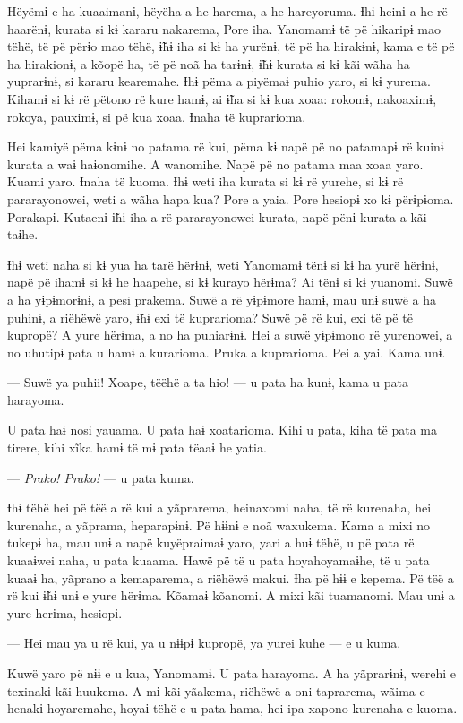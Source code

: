 Hëyëmɨ e ha kuaaimanɨ, hëyëha a he harema, a he hareyoruma. Ɨhɨ heinɨ a
he rë haarënɨ, kurata si kɨ kararu nakarema, Pore iha. Yanomamɨ të pë
hikaripɨ mao tëhë, të pë përɨo mao tëhë, ɨ̃hɨ iha si kɨ ha yurënɨ, të pë
ha hirakɨnɨ, kama e të pë ha hirakionɨ, a kõopë ha, të pë noã ha tarɨnɨ,
ɨ̃hɨ kurata si kɨ kãi wãha ha yuprarɨnɨ, si kararu kearemahe. Ɨhɨ pëma a
piyëmaɨ puhio yaro, si kɨ yurema. Kihamɨ si kɨ rë pëtono rë kure hamɨ,
ai ɨ̃ha si kɨ kua xoaa: rokomɨ, nakoaximɨ, rokoya, pauximɨ, si pë kua
xoaa. Ɨnaha të kuprarioma. 

Hei kamiyë pëma kɨnɨ no patama rë kui, pëma kɨ napë pë no patamapɨ rë
kuinɨ kurata a waɨ haɨonomihe. A wanomihe. Napë pë no patama maa xoaa
yaro. Kuami yaro. Ɨnaha të kuoma. Ɨhɨ weti iha kurata si kɨ rë yurehe,
si kɨ rë pararayonowei, weti a wãha hapa kua? Pore a yaia. Pore hesiopɨ
xo kɨ përɨpɨoma. Porakapɨ. Kutaenɨ ɨ̃hɨ iha a rë pararayonowei kurata,
napë pënɨ kurata a kãi taɨhe. 

Ɨhɨ weti naha si kɨ yua ha tarë hërɨnɨ, weti Yanomamɨ tënɨ si kɨ ha yurë
hërɨnɨ, napë pë ihamɨ si kɨ he haapehe, si kɨ kurayo hërɨma? Ai tënɨ si
kɨ yuanomi. Suwë a ha yɨpɨmorɨnɨ, a pesi prakema. Suwë a rë yɨpɨmore
hamɨ, mau unɨ suwë a ha puhinɨ, a riëhëwë yaro, ɨ̃hɨ exi të kuprarioma?
Suwë pë rë kui, exi të pë të kupropë? A yure hërɨma, a no ha puhiarɨnɨ.
Hei a suwë yɨpɨmono rë yurenowei, a no uhutipɨ pata u hamɨ a kurarioma.
Pruka a kuprarioma. Pei a yai. Kama unɨ. 

--- Suwë ya puhii! Xoape, tëëhë a ta hio! --- u pata ha kunɨ, kama u pata
harayoma. 

U pata haɨ nosi yauama. U pata haɨ xoatarioma. Kihi u pata, kiha të pata
ma tirere, kihi xĩka hamɨ të mɨ pata tëaaɨ he yatia. 

--- \textit{Prako! Prako!} --- u pata kuma. 

Ɨhɨ tëhë hei pë tëë a rë kui a yãprarema, heinaxomi naha, të rë
kurenaha, hei kurenaha, a yãprama, heparapɨnɨ. Pë hɨɨnɨ e noã waxukema.
Kama a mixi no tukepɨ ha, mau unɨ a napë kuyëpraimaɨ yaro, yari a huɨ
tëhë, u pë pata rë kuaaɨwei naha, u pata kuaama. Hawë pë të u pata
hoyahoyamaɨhe, të u pata kuaaɨ ha, yãprano a kemaparema, a riëhëwë
makui. Ɨha pë hɨɨ e kepema. Pë tëë a rë kui ɨ̃hɨ unɨ e yure hërɨma.
Kõamaɨ kõanomi. A mixi kãi tuamanomi. Mau unɨ a yure herɨma, hesiopɨ. 

--- Hei mau ya u rë kui, ya u nɨɨpɨ kupropë, ya yurei kuhe --- e u kuma. 

Kuwë yaro pë nɨɨ e u kua, Yanomamɨ. U pata harayoma. A ha yãprarɨnɨ,
werehi e texinakɨ kãi huukema. A mɨ kãi yãakema, riëhëwë a oni
taprarema, wãima e henakɨ hoyaremahe, hoyaɨ tëhë e u pata hama, hei ipa
xapono kurenaha e kuoma. 

